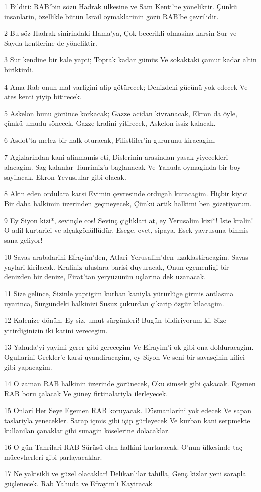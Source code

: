 \par 1 Bildiri: RAB'bin sözü Hadrak ülkesine ve Sam Kenti'ne yöneliktir. Çünkü insanlarin, özellikle bütün Israil oymaklarinin gözü RAB'be çevrilidir.
\par 2 Bu söz Hadrak sinirindaki Hama'ya, Çok becerikli olmasina karsin Sur ve Sayda kentlerine de yöneliktir.
\par 3 Sur kendine bir kale yapti; Toprak kadar gümüs Ve sokaktaki çamur kadar altin biriktirdi.
\par 4 Ama Rab onun mal varligini alip götürecek; Denizdeki gücünü yok edecek Ve ates kenti yiyip bitirecek.
\par 5 Askelon bunu görünce korkacak; Gazze acidan kivranacak, Ekron da öyle, çünkü umudu sönecek. Gazze kralini yitirecek, Askelon issiz kalacak.
\par 6 Asdot'ta melez bir halk oturacak, Filistliler'in gururunu kiracagim.
\par 7 Agizlarindan kani alinmamis eti, Dislerinin arasindan yasak yiyecekleri alacagim. Sag kalanlar Tanrimiz'a baglanacak Ve Yahuda oymaginda bir boy sayilacak. Ekron Yevuslular gibi olacak.
\par 8 Akin eden ordulara karsi Evimin çevresinde ordugah kuracagim. Hiçbir kiyici Bir daha halkimin üzerinden geçmeyecek, Çünkü artik halkimi ben gözetiyorum.
\par 9 Ey Siyon kizi*, sevinçle cos! Sevinç çigliklari at, ey Yerusalim kizi*! Iste kralin! O adil kurtarici ve alçakgönüllüdür. Esege, evet, sipaya, Esek yavrusuna binmis sana geliyor!
\par 10 Savas arabalarini Efrayim'den, Atlari Yerusalim'den uzaklastiracagim. Savas yaylari kirilacak. Kraliniz uluslara barisi duyuracak, Onun egemenligi bir denizden bir denize, Firat'tan yeryüzünün uçlarina dek uzanacak.
\par 11 Size gelince, Sizinle yaptigim kurban kaniyla yürürlüge girmis antlasma uyarinca, Sürgündeki halkinizi Susuz çukurdan çikarip özgür kilacagim.
\par 12 Kalenize dönün, Ey siz, umut sürgünleri! Bugün bildiriyorum ki, Size yitirdiginizin iki katini verecegim.
\par 13 Yahuda'yi yayimi gerer gibi gerecegim Ve Efrayim'i ok gibi ona dolduracagim. Ogullarini Grekler'e karsi uyandiracagim, ey Siyon Ve seni bir savasçinin kilici gibi yapacagim.
\par 14 O zaman RAB halkinin üzerinde görünecek, Oku simsek gibi çakacak. Egemen RAB boru çalacak Ve güney firtinalariyla ilerleyecek.
\par 15 Onlari Her Seye Egemen RAB koruyacak. Düsmanlarini yok edecek Ve sapan taslariyla yenecekler. Sarap içmis gibi içip gürleyecek Ve kurban kani serpmekte kullanilan çanaklar gibi sunagin köselerine dolacaklar.
\par 16 O gün Tanrilari RAB Sürüsü olan halkini kurtaracak. O'nun ülkesinde taç mücevherleri gibi parlayacaklar.
\par 17 Ne yakisikli ve güzel olacaklar! Delikanlilar tahilla, Genç kizlar yeni sarapla güçlenecek. Rab Yahuda ve Efrayim'i Kayiracak


